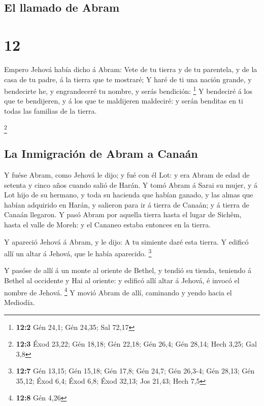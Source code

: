 \hypertarget{el-llamado-de-abram}{%
\subsection{El llamado de Abram}\label{el-llamado-de-abram}}

\hypertarget{section-11}{%
\section{12}\label{section-11}}

 Empero Jehová había dicho á Abram: Vete de tu tierra y de
tu parentela, y de la casa de tu padre, á la tierra que te mostraré;
 Y haré de ti una nación grande, y bendecirte he, y
engrandeceré tu nombre, y serás bendición: \footnote{\textbf{12:2} Gén
  24,1; Gén 24,35; Sal 72,17}  Y bendeciré á los que te
bendijeren, y á los que te maldijeren maldeciré: y serán benditas en ti
todas las familias de la tierra.

\footnote{\textbf{12:3} Éxod 23,22; Gén 18,18; Gén 22,18; Gén 26,4; Gén
  28,14; Hech 3,25; Gal 3,8}

\hypertarget{la-inmigraciuxf3n-de-abram-a-canauxe1n}{%
\subsection{La Inmigración de Abram a
Canaán}\label{la-inmigraciuxf3n-de-abram-a-canauxe1n}}

 Y fuése Abram, como Jehová le dijo; y fué con él Lot: y
era Abram de edad de setenta y cinco años cuando salió de Harán.
 Y tomó Abram á Sarai su mujer, y á Lot hijo de su
hermano, y toda su hacienda que habían ganado, y las almas que habían
adquirido en Harán, y salieron para ir á tierra de Canaán; y á tierra de
Canaán llegaron.  Y pasó Abram por aquella tierra hasta el
lugar de Sichêm, hasta el valle de Moreh: y el Cananeo estaba entonces
en la tierra.

 Y apareció Jehová á Abram, y le dijo: A tu simiente daré
esta tierra. Y edificó allí un altar á Jehová, que le había aparecido.
\footnote{\textbf{12:7} Gén 13,15; Gén 15,18; Gén 17,8; Gén 24,7; Gén
  26,3-4; Gén 28,13; Gén 35,12; Éxod 6,4; Éxod 6,8; Éxod 32,13; Jos
  21,43; Hech 7,5}

 Y pasóse de allí á un monte al oriente de Bethel, y
tendió su tienda, teniendo á Bethel al occidente y Hai al oriente: y
edificó allí altar á Jehová, é invocó el nombre de Jehová. \footnote{\textbf{12:8}
  Gén 4,26}  Y movió Abram de allí, caminando y yendo
hacia el Mediodía.

